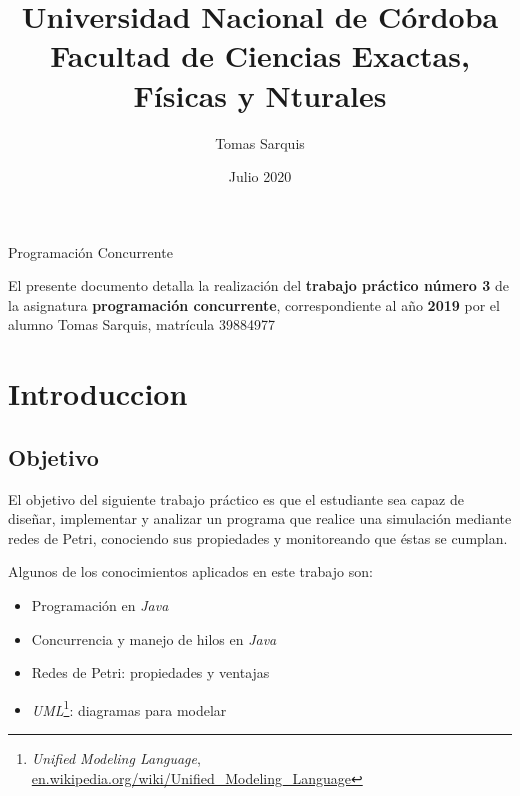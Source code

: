 \documentclass{article}
\title{Universidad Nacional de Córdoba\\Facultad de Ciencias Exactas, Físicas y Nturales}
\author{Tomas Sarquis}
\date{Julio 2020}
\newcommand{\fnuml}{\emph{Unified Modeling Language}, \url{en.wikipedia.org/wiki/Unified_Modeling_Language}}
\begin{document}
    \begin{titlingpage}
        \maketitle
        \null \null \null \null
        \begin{center}
            {\huge Programación Concurrente}
        \end{center}
        \vspace*{\fill}
        \justify
        El presente documento detalla la realización del \textbf{trabajo práctico número 3} 
        de la asignatura \textbf{programación concurrente}, correspondiente al año \textbf{2019}
        por el alumno Tomas Sarquis, matrícula 39884977
        \vspace*{\fill}
    \end{titlingpage}
    \tableofcontents \newpage
    \section{Introduccion}
    \subsection{Objetivo}
    El objetivo del siguiente trabajo práctico es que el estudiante sea capaz de diseñar,
    implementar y analizar un programa que realice una simulación mediante redes de Petri,
    conociendo sus propiedades y monitoreando que éstas se cumplan. \par
    Algunos de los conocimientos aplicados en este trabajo son: \\
    \begin{itemize}
        \item Programación en \emph{Java}
        \item Concurrencia y manejo de hilos en \emph{Java}
        \item Redes de Petri: propiedades y ventajas
        \item \emph{UML}\footnote{\fnuml}: diagramas para modelar
    \end{itemize}
\end{document}
